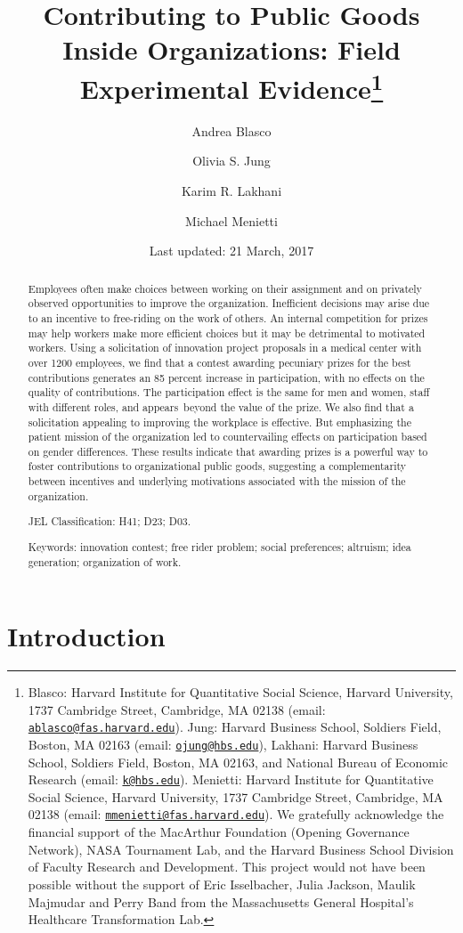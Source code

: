 \documentclass[11pt, titlepage]{article}
\institute{}
\title{Contributing to Public Goods Inside Organizations: Field Experimental
Evidence\thanks{Blasco: Harvard Institute for Quantitative Social Science, Harvard
University, 1737 Cambridge Street, Cambridge, MA 02138 (email:
\href{mailto:ablasco@fas.harvard.edu}{\nolinkurl{ablasco@fas.harvard.edu}}).
Jung: Harvard Business School, Soldiers Field, Boston, MA 02163 (email:
\href{mailto:ojung@hbs.edu}{\nolinkurl{ojung@hbs.edu}}), Lakhani:
Harvard Business School, Soldiers Field, Boston, MA 02163, and National
Bureau of Economic Research (email:
\href{mailto:k@hbs.edu}{\nolinkurl{k@hbs.edu}}). Menietti: Harvard
Institute for Quantitative Social Science, Harvard University, 1737
Cambridge Street, Cambridge, MA 02138 (email:
\href{mailto:mmenietti@fas.harvard.edu}{\nolinkurl{mmenietti@fas.harvard.edu}}).
We gratefully acknowledge the financial support of the MacArthur
Foundation (Opening Governance Network), NASA Tournament Lab, and the
Harvard Business School Division of Faculty Research and Development.
This project would not have been possible without the support of Eric
Isselbacher, Julia Jackson, Maulik Majmudar and Perry Band from the
Massachusetts General Hospital's Healthcare Transformation Lab.}}
\author{Andrea Blasco \and Olivia S. Jung \and Karim R. Lakhani \and Michael Menietti}
\date{Last updated: 21 March, 2017}
\begin{document}
\maketitle
\begin{abstract}
Employees often make choices between working on their assignment and on
privately observed opportunities to improve the organization.
Inefficient decisions may arise due to an incentive to free-riding on
the work of others. An internal competition for prizes may help workers
make more efficient choices but it may be detrimental to motivated
workers. Using a solicitation of innovation project proposals in a
medical center with over 1200 employees, we find that a contest awarding
pecuniary prizes for the best contributions generates an 85 percent
increase in participation, with no effects on the quality of
contributions. The participation effect is the same for men and women,
staff with different roles, and appears~beyond the value of the prize.
We also find that a solicitation appealing to improving the workplace is
effective. But emphasizing the patient mission of the organization led
to countervailing effects on participation based on gender differences.
These results indicate that awarding prizes is a powerful way to foster
contributions to organizational public goods, suggesting a
complementarity between incentives and underlying motivations associated
with the mission of the organization.

\smallskip\noindent 
JEL Classification: H41; D23; D03.

\smallskip\noindent 
Keywords: innovation contest; free rider problem; social preferences; altruism; idea generation; organization of work.
\end{abstract}


\clearpage
\tableofcontents
\setcounter{tocdepth}{2}
\clearpage

\section{Introduction}\label{introduction}
\end{document}
